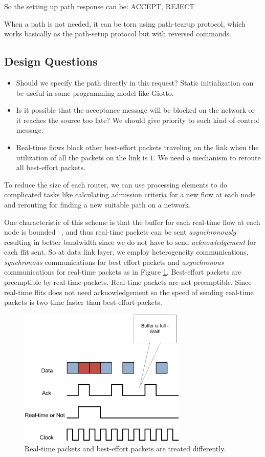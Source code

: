 \documentclass[conference, twocolumn]{IEEEtran}
\theoremstyle{definition}
\begin{document}
So the setting up path response can be: ACCEPT, REJECT

When a path is not needed, it can be torn using path-tearup protocol, which
works basically as the path-setup protocol but with reversed commands.

\subsection{Design Questions}
\begin{itemize}
\item Should we specify the path directly in this request? Static initialization 
can be useful in some programming model like Giotto.	
\item Is it possible that the acceptance message will be blocked on the network 
or it reaches the source too late? We should give priority to such kind of control
message.
\item Real-time flows block other best-effort packets traveling on the link when 
the utilization of all the packets on the link is $1$. We need a mechanism to
reroute all best-effort packets.
\end{itemize}

To reduce the size of each router, we can use processing elements to do 
complicated tasks like calculating admission criteria for a new flow at each node 
and rerouting for finding a new suitable path on a network.


One characteristic of this scheme is that the buffer for each 
real-time flow at each node is bounded ~\cite{Ferrari90ascheme}, and thus
real-time packets can be sent {\em asynchronously} resulting in better bandwidth
since we do not have to send {\em acknowledgement} for each flit sent. So at
data link layer, we employ heterogeneity communications, {\em synchronous}
communications for best effort packets and {\em asynchronous} communications
for real-time packets as in Figure \ref{fig:HeteroComm}. Best-effort packets
are preemptible by real-time packets. Real-time packets are not preemptible.
Since real-time flits does not need acknowledgement so the speed of sending
real-time packets is two time faster than best-effort packets.


\begin{figure}[htbp]
\centering
\includegraphics[width=8cm]{pics/HeteroComm.png}
\caption[Heterogeneous Communication for Packets.]
{Real-time packets and best-effort packets are treated
differently.}\label{fig:HeteroComm}
\end{figure}
\end{document}
